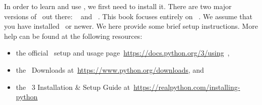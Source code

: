 %
\label{sec:installingPython}%
In order to learn and use \python, we first need to install it.
There are two major versions of \python\ out there: \python~ and \python~.
This book focuses entirely on \python~.
We assume that you have installed \pythonWithVersion\ or newer.
We here provide some brief setup instructions.
More help can be found at the following resources:%
%
\begin{itemize}%
\item the official \python\ setup and usage page~\url{https://docs.python.org/3/using}~\cite{PSF2024PSAU},%
\item the \python\ Downloads at~\url{https://www.python.org/downloads}, and%
\item the \python~3 Installation \& Setup Guide at~\url{https://realpython.com/installing-python}%
\end{itemize}%
%
%
%
%
\endhsection%
%
